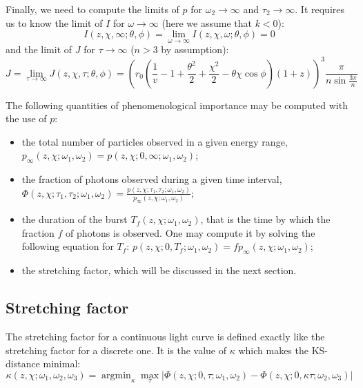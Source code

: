 \documentclass[manuscript]{aastex}
\DeclareMathOperator*{\argmin}{argmin}
\begin{document}
Finally, we need to compute the limits of $p$ for $\omega_2
\rightarrow \infty$ and $\tau_2 \rightarrow \infty$. It requires us to
know the limit of $I$ for $\omega \rightarrow \infty$ (here we assume that
$k < 0$):
\begin{equation}
I\left(z,\chi,\infty;\theta,\phi\right) = \lim_{\omega \rightarrow \infty} I\left(z,\chi,\omega;\theta,\phi\right) = 0
\end{equation}
and the limit of $J$ for $\tau \rightarrow \infty$ ($n > 3$ by assumption):
\begin{equation}
J = \lim_{\tau \rightarrow \infty} J\left(z,\chi,\tau;\theta,\phi\right) = \left(r_0 \left( \frac{1}{v} -  1 + \frac{\theta^2}{2} + \frac{\chi^2}{2} - \theta\chi\cos\phi \right) \left(1+z\right)\right)^3 \frac{\pi}{n\sin\frac{3\pi}{n}}
\end{equation}

The following quantities of phenomenological importance may be
computed with the use of $p$:
\begin{itemize}
\item{the total number of particles observed in a given energy range,
  $p_\infty\left(z,\chi; \omega_1,\omega_2\right) = p\left( z,\chi;
  0,\infty; \omega_1,\omega_2 \right)$;}
\item{the fraction of photons observed during a given time interval,
  $\Phi\left(z,\chi; \tau_1,\tau_2; \omega_1,\omega_2\right) =
  \frac{p\left( z,\chi; \tau_1,\tau_2;
    \omega_1,\omega_2\right)}{p_\infty\left( z,\chi; \omega_1,\omega_2
    \right)}$;}
\item{the duration of the burst $T_f\left( z,\chi;\omega_1,\omega_2
  \right)$, that is the time by which the fraction $f$ of photons is
  observed. One may compute it by solving the following equation for
  $T_f$: $p\left( z,\chi; 0,T_f; \omega_1,\omega_2\right) = f
  p_\infty\left( z,\chi; \omega_1,\omega_2 \right)$;}
\item{the stretching factor, which will be discussed in the next
  section.}
\end{itemize}

\subsection{Stretching factor}
The stretching factor for a continuous light curve is defined exactly
like the stretching factor for a discrete one. It is the value of
$\kappa$ which makes the KS-distance minimal:
\begin{equation}
\kappa\left(z,\chi; \omega_1, \omega_2, \omega_3\right) = \argmin_\kappa \max_\tau\left| \Phi\left(z,\chi; 0,\tau; \omega_1,\omega_2\right) - \Phi\left( z,\chi; 0,\kappa \tau; \omega_2,\omega_3 \right) \right|
\end{equation}
\end{document}
